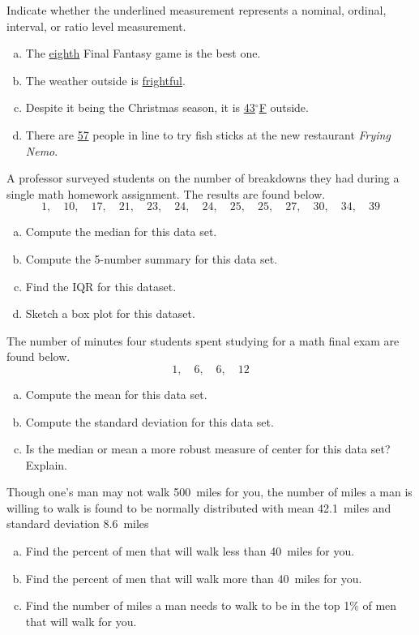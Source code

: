 \documentclass[12pt,letterpaper]{exam}
\begin{document}
\begin{questions}
\newpage
\question[10] Indicate whether the underlined measurement represents a nominal, ordinal, interval, or ratio level measurement.
	\begin{enumerate}[(a)]
	\item The \underline{eighth} Final Fantasy game is the best one. 
	\item The weather outside is \underline{frightful}. 	
	\item Despite it being the Christmas season, it is \underline{43$^\circ$F} outside. 
	\item There are \underline{57} people in line to try fish sticks at the new restaurant \textit{Frying Nemo}. 
	\end{enumerate}



\newpage
\question[10] A professor surveyed students on the number of breakdowns they had during a single math homework assignment. The results are found below. 
	\[
	1, \quad 10, \quad 17, \quad 21, \quad 23, \quad 24, \quad 24, \quad 25, \quad 25, \quad 27, \quad 30, \quad 34, \quad 39
	\]

\begin{enumerate}[(a)]
\item Compute the median for this data set. 
\item Compute the 5-number summary for this data set. 
\item Find the IQR for this dataset. 
\item Sketch a box plot for this dataset. 
\end{enumerate}



\newpage
\question[10] The number of minutes four students spent studying for a math final exam are found below. 
	\[
	1, \quad 6, \quad 6, \quad 12
	\]

\begin{enumerate}[(a)]
\item Compute the mean for this data set.
\item Compute the standard deviation for this data set. 
\item Is the median or mean a more robust measure of center for this data set? Explain. 
\end{enumerate}



\newpage
\question[10] Though one's man may not walk 500~miles for you, the number of miles a man is willing to walk is found to be normally distributed with mean 42.1~miles and standard deviation 8.6~miles
	\begin{enumerate}[(a)]
	\item Find the percent of men that will walk less than 40~miles for you.
	\item Find the percent of men that will walk more than 40~miles for you.
	\item Find the number of miles a man needs to walk to be in the top 1\% of men that will walk for you.
	\end{enumerate}




\end{questions}
\end{document}
